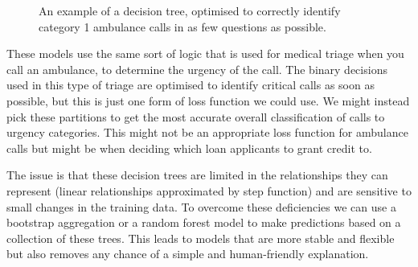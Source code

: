 \documentclass[
  letterpaper,
  DIV=11,
  numbers=noendperiod]{scrreprt}
\begin{document}
\begin{figure}


\caption{\label{fig-abulance-triage}An example of a decision tree,
optimised to correctly identify category 1 ambulance calls in as few
questions as possible.}

\end{figure}%

These models use the same sort of logic that is used for medical triage
when you call an ambulance, to determine the urgency of the call. The
binary decisions used in this type of triage are optimised to identify
critical calls as soon as possible, but this is just one form of loss
function we could use. We might instead pick these partitions to get the
most accurate overall classification of calls to urgency categories.
This might not be an appropriate loss function for ambulance calls but
might be when deciding which loan applicants to grant credit to.

The issue is that these decision trees are limited in the relationships
they can represent (linear relationships approximated by step function)
and are sensitive to small changes in the training data. To overcome
these deficiencies we can use a bootstrap aggregation or a random forest
model to make predictions based on a collection of these trees. This
leads to models that are more stable and flexible but also removes any
chance of a simple and human-friendly explanation.
\end{document}
